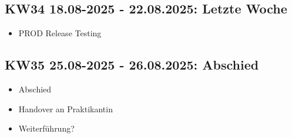\subsection{KW34 18.08-2025 - 22.08.2025: Letzte Woche}
\begin{itemize}
  \item PROD Release Testing
\end{itemize}


\subsection{KW35 25.08-2025 - 26.08.2025: Abschied}
\begin{itemize}
  \item Abschied
  \item Handover an Praktikantin
  \item Weiterführung?
\end{itemize}